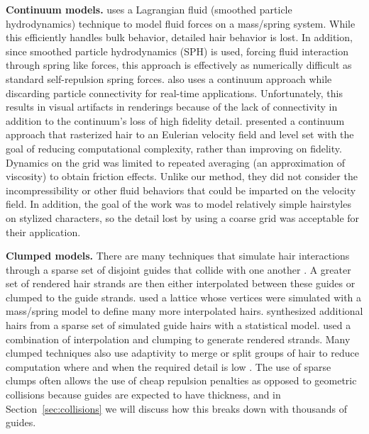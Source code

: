 \textbf{Continuum models.}  \cite{hadap:2001:continuum-hair} uses a Lagrangian
fluid (smoothed particle hydrodynamics) technique to model fluid forces on a
mass/spring system. While this efficiently handles bulk behavior, detailed hair
behavior is lost. In addition, since smoothed particle hydrodynamics (SPH) is
used, forcing fluid interaction through spring like forces, this approach is
effectively as numerically difficult as standard self-repulsion spring forces.
\cite{bando:2003:hair-loosely-connected-particles} also uses a continuum
approach while discarding particle connectivity for real-time
applications. Unfortunately, this results in visual artifacts in renderings
because of the lack of connectivity in addition to the continuum's loss of high
fidelity detail.  \cite{petrovic:2005:levelset-hair} presented a continuum
approach that rasterized hair to an Eulerian velocity field and level set with
the goal of reducing computational complexity, rather than improving on
fidelity. Dynamics on the grid was limited to repeated averaging (an
approximation of viscosity) to obtain friction effects. Unlike our method,
they did not consider the incompressibility or other fluid behaviors that could
be imparted on the velocity field. In addition, the goal of the work was to
model relatively simple hairstyles on stylized characters, so the detail lost by
using a coarse grid was acceptable for their application.

\textbf{Clumped models.}  There are many techniques that simulate hair
interactions through a sparse set of disjoint guides that collide with one
another
\cite{bertails:2006:superhelices,hadap:2006:orientedstrands,gupta:2006:real-time-hair,chang:2002:mutualinteractions}.
A greater set of rendered hair strands are then either interpolated between
these guides or clumped to the guide strands.
\cite{plante:2002:hair-complexity} used a lattice whose vertices were simulated
with a mass/spring model to define many more interpolated
hairs. \cite{choe:2005:simulating-complex-hair} synthesized additional hairs
from a sparse set of simulated guide hairs with a statistical
model. \cite{bertails:2006:superhelices} used a combination of interpolation and
clumping to generate rendered strands.  Many clumped techniques also use
adaptivity to merge or split groups of hair to reduce computation where and when
the required detail is low
\cite{bertails:2003:adaptive-wisp-tree,ward:2003:modeling-hair-lod,ward:2003:adaptive-grouping-hair}. The
use of sparse clumps often allows the use of cheap repulsion penalties as
opposed to geometric collisions because guides are expected to have
thickness, and in Section~\ref{sec:collisions} we will discuss how this breaks
down with thousands of guides.

